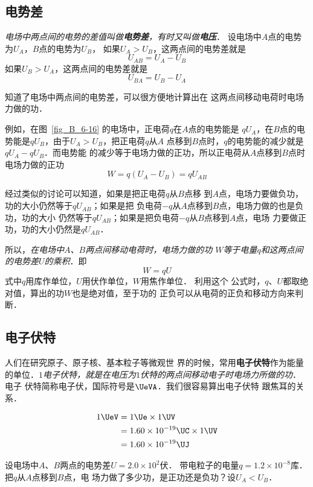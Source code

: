 \subsection{电势差}
\textit{电场中两点间的电势的差值叫做\textbf{电势差}，有时又叫做\textbf{电压}}．
设电场中$A$点的电势为$U_A$，$B$点的电势为$U_B$，
如果$U_A>U_B$，这两点间的电势差就是
\[U_{AB}=U_A-U_B \]
如果$U_B>U_A$，这两点间的电势差就是
\[U_{BA}=U_B-U_A \]

知道了电场中两点间的电势差，可以很方便地计算出在
这两点间移动电荷时电场力做的功．

例如，在图~\ref{fig_B_6-16} 的电场中，正电荷$q$在$A$点的电势能是
$qU_A$，在$B$点的电势能是$qU_B$，由于$U_A>U_B$，把正电荷$q$从$A$
点移到$B$点时，$q$的电势能的减少就是$qU_A-qU_B$．而电势能
的减少等于电场力做的正功，所以正电荷从$A$点移到$B$点时
电场力做的正功
\[W=q(U_A-U_B)=qU_{AB}\]

经过类似的讨论可以知道，如果是把正电荷$q$从$B$点移
到$A$点，电场力要做负功，功的大小仍然等于$qU_{AB}$；如果是把
负电荷$-q$从$A$点移到$B$点，电场力做的也是负功，功的大小
仍然等于$qU_{AB}$；如果是把负电荷$-q$从$B$点移到$A$点，电场
力要做正功，功的大小仍然是$qU_{AB}$．

所以，\textit{在电场中$A$、$B$两点间移动电荷时，电场力做的功
$W$等于电量$q$和这两点间的电势差$U$的乘积}．即
\[W=qU\]
式中$q$用库作单位，$U$用伏作单位，$W$用焦作单位．
利用这个
公式时，$q$、$U$都取绝对值，算出的功$W$也是绝对值，至于功的
正负可以从电荷的正负和移动方向来判断．

\subsection{电子伏特}


人们在研究原子、原子核、基本粒子等微观世
界的时候，常用\textbf{电子伏特}作为能量的单位．\textit{$1$电子伏特，就是在电压为$1$伏特的两点间移动电子时电场力所做的功}．
电子
伏特简称电子伏，国际符号是$\UeVA$．我们很容易算出电子伏特
跟焦耳的关系．

\[\begin{split}
    1 \UeV &=1 \Ue \times 1 \UV \\
    &=1.60\times 10^{-19} \UC \times 1 \UV\\
&=1.60\times 10^{-19} \UJ 
\end{split}    \]


\begin{example}
    设电场中$A$、$B$两点的电势差$U=2.0\times10^2$伏．
    带电粒子的电量$q=1.2\times10^{-8}$库．
    把$q$从$A$点移到$B$点，电
    场力做了多少功，是正功还是负功？设$U_A<U_B$．
\end{example}

